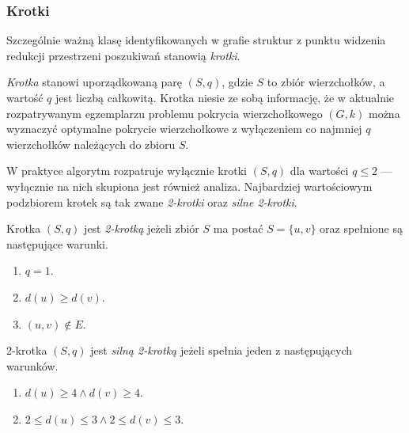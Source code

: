 \subsubsection{\textbf{Krotki}}
\label{sss_ckx_tuples}
\par{
  Szczególnie ważną klasę identyfikowanych w grafie struktur z punktu widzenia redukcji przestrzeni poszukiwań stanowią \emph{krotki}.
  \begin{definition}
    \emph{Krotka} stanowi uporządkowaną parę $(S, q)$, gdzie $S$ to zbiór wierzchołków, a wartość $q$ jest liczbą całkowitą.
    Krotka niesie ze sobą informację, że w aktualnie rozpatrywanym egzemplarzu problemu pokrycia wierzchołkowego $(G, k)$ można wyznaczyć optymalne pokrycie wierzchołkowe z wyłączeniem co najmniej $q$ wierzchołków należących do zbioru $S$.
  \end{definition}
  W praktyce algorytm rozpatruje wyłącznie krotki $(S, q)$ dla wartości $q \leq 2$ --- wyłącznie na nich skupiona jest również analiza.
  Najbardziej wartościowym podzbiorem krotek są tak zwane \emph{2-krotki} oraz \emph{silne 2-krotki}.
  \begin{definition}
    Krotka $(S, q)$ jest \emph{2-krotką} jeżeli zbiór $S$ ma postać $S=\{u, v\}$ oraz spełnione są następujące warunki.
    \begin{enumerate}
      \item $q=1$.
      \item $d(u) \geq d(v)$.
      \item $(u, v) \notin E$.
    \end{enumerate}
  \end{definition}
  \begin{definition}
    2-krotka $(S, q)$ jest \emph{silną 2-krotką} jeżeli spełnia jeden z następujących warunków.
    \begin{enumerate}
      \item $d(u) \geq 4 \land d(v) \geq 4$.
      \item $2 \leq d(u) \leq 3 \land 2 \leq d(v) \leq 3$.
    \end{enumerate}
  \end{definition}
}
